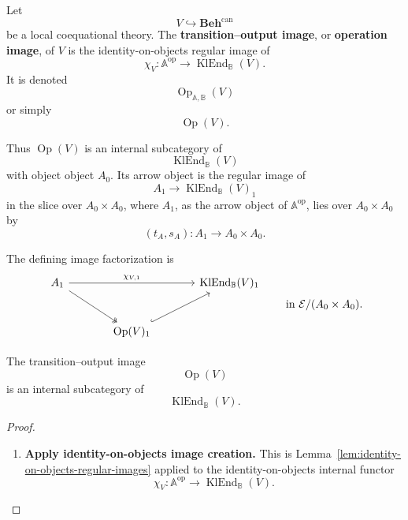 \begin{definition}
\label{def:operation-image}
    Let
    \[
        V\hookrightarrow\mathbf{Beh}^{\mathrm{can}}
    \]
    be a local coequational theory. The \textbf{transition--output image}, or
    \textbf{operation image}, of \(V\) is the identity-on-objects regular image
    of
    \[
        \chi_V:
        \mathbb A^{\mathrm{op}}
        \to
        \operatorname{KlEnd}_{\mathbb B}(V).
    \]
    It is denoted
    \[
        \operatorname{Op}_{\mathbb A,\mathbb B}(V)
    \]
    or simply
    \[
        \operatorname{Op}(V).
    \]
\end{definition}

Thus \(\operatorname{Op}(V)\) is an internal subcategory of
\[
    \operatorname{KlEnd}_{\mathbb B}(V)
\]
with object object \(A_0\). Its arrow object is the regular image of
\[
    A_1\to \operatorname{KlEnd}_{\mathbb B}(V)_1
\]
in the slice over \(A_0\times A_0\), where \(A_1\), as the arrow object of
\(\mathbb A^{\mathrm{op}}\), lies over \(A_0\times A_0\) by
\[
    (t_A,s_A):A_1\to A_0\times A_0.
\]

The defining image factorization is
\[
\begin{tikzcd}[column sep=large, row sep=large]
    A_1
        \arrow[rr, "\chi_{V,1}"]
        \arrow[dr, two heads]
    &&
    \operatorname{KlEnd}_{\mathbb B}(V)_1
    \\
    &
    \operatorname{Op}(V)_1
        \arrow[ur, hook]
    &
\end{tikzcd}
\qquad
\text{in }\mathcal E/(A_0\times A_0).
\]

\begin{proposition}
\label{prop:operation-image-subcategory}
    The transition--output image
    \[
        \operatorname{Op}(V)
    \]
    is an internal subcategory of
    \[
        \operatorname{KlEnd}_{\mathbb B}(V).
    \]
\end{proposition}

\begin{proof}
    \leavevmode
    \begin{enumerate}
        \item \textbf{Apply identity-on-objects image creation.}
        This is Lemma~\ref{lem:identity-on-objects-regular-images} applied to
        the identity-on-objects internal functor
        \[
            \chi_V:
            \mathbb A^{\mathrm{op}}
            \to
            \operatorname{KlEnd}_{\mathbb B}(V).
        \]
    \end{enumerate}
\end{proof}

